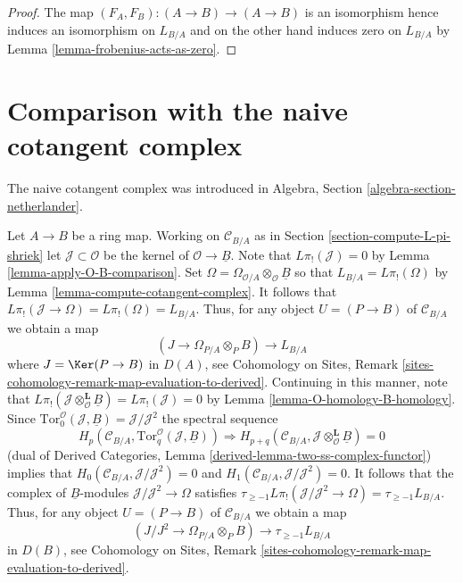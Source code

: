 \begin{proof}
The map $(F_A, F_B) : (A \to B) \to (A \to B)$ is an isomorphism
hence induces an isomorphism on $L_{B/A}$ and on the other hand
induces zero on $L_{B/A}$ by Lemma \ref{lemma-frobenius-acts-as-zero}.
\end{proof}





\section{Comparison with the naive cotangent complex}
\label{section-surjections}

\noindent
The naive cotangent complex was introduced in
Algebra, Section \ref{algebra-section-netherlander}.

\begin{remark}
\label{remark-make-map}
Let $A \to B$ be a ring map.  Working on $\mathcal{C}_{B/A}$ as in
Section \ref{section-compute-L-pi-shriek} let
$\mathcal{J} \subset \mathcal{O}$ be the kernel of
$\mathcal{O} \to \underline{B}$. Note that $L\pi_!(\mathcal{J}) = 0$ by
Lemma \ref{lemma-apply-O-B-comparison}. Set
$\Omega =  \Omega_{\mathcal{O}/A} \otimes_\mathcal{O} \underline{B}$
so that
$L_{B/A} = L\pi_!(\Omega)$ by Lemma \ref{lemma-compute-cotangent-complex}.
It follows that $L\pi_!(\mathcal{J} \to \Omega) = L\pi_!(\Omega) = L_{B/A}$.
Thus, for any object $U = (P \to B)$ of $\mathcal{C}_{B/A}$ we obtain a map
\begin{equation}
\label{equation-comparison-map-A}
(J \to \Omega_{P/A} \otimes_P B) \longrightarrow L_{B/A}
\end{equation}
where $J = \Ker(P \to B)$ in $D(A)$, see
Cohomology on Sites, Remark
\ref{sites-cohomology-remark-map-evaluation-to-derived}.
Continuing in this manner, note that
$L\pi_!(\mathcal{J} \otimes_\mathcal{O}^\mathbf{L} \underline{B}) =
L\pi_!(\mathcal{J}) = 0$ by
Lemma \ref{lemma-O-homology-B-homology}.
Since $\text{Tor}_0^\mathcal{O}(\mathcal{J}, \underline{B}) =
\mathcal{J}/\mathcal{J}^2$
the spectral sequence
$$
H_p(\mathcal{C}_{B/A}, \text{Tor}_q^\mathcal{O}(\mathcal{J}, \underline{B}))
\Rightarrow 
H_{p + q}(\mathcal{C}_{B/A},
\mathcal{J} \otimes_\mathcal{O}^\mathbf{L} \underline{B}) = 0
$$
(dual of
Derived Categories, Lemma \ref{derived-lemma-two-ss-complex-functor})
implies that
$H_0(\mathcal{C}_{B/A}, \mathcal{J}/\mathcal{J}^2) = 0$
and $H_1(\mathcal{C}_{B/A}, \mathcal{J}/\mathcal{J}^2) = 0$.
It follows that the complex of $\underline{B}$-modules
$\mathcal{J}/\mathcal{J}^2 \to \Omega$ satisfies
$\tau_{\geq -1}L\pi_!(\mathcal{J}/\mathcal{J}^2 \to \Omega) =
\tau_{\geq -1}L_{B/A}$.
Thus, for any object $U = (P \to B)$ of $\mathcal{C}_{B/A}$ we obtain a map
\begin{equation}
\label{equation-comparison-map}
(J/J^2 \to \Omega_{P/A} \otimes_P B) \longrightarrow \tau_{\geq -1}L_{B/A}
\end{equation}
in $D(B)$, see
Cohomology on Sites, Remark
\ref{sites-cohomology-remark-map-evaluation-to-derived}.
\end{remark}

